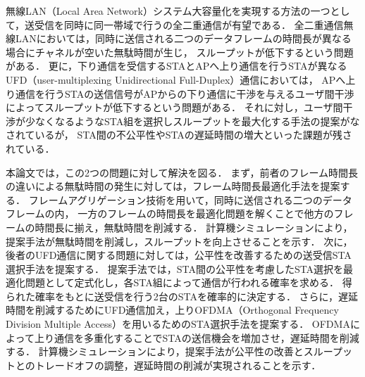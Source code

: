 \documentclass[master]{kuisthesis}		%
\date{平成28年2月8日}				%
\begin{document}
\maketitle					%

\begin{jabstract}				%
	無線LAN（Local Area Network）システム大容量化を実現する方法の一つとして，送受信を同時に同一帯域で行うの全二重通信が有望である．
	全二重通信無線LANにおいては，同時に送信される二つのデータフレームの時間長が異なる場合にチャネルが空いた無駄時間が生じ，
	スループットが低下するという問題がある．
	更に，下り通信を受信するSTAとAPへ上り通信を行うSTAが異なるUFD（user-multiplexing Unidirectional Full-Duplex）通信においては，
	APへ上り通信を行うSTAの送信信号がAPからの下り通信に干渉を与えるユーザ間干渉によってスループットが低下するという問題がある．
	それに対し，ユーザ間干渉が少なくなるようなSTA組を選択しスループットを最大化する手法の提案がなされているが，
	STA間の不公平性やSTAの遅延時間の増大といった課題が残されている．
	\par
	本論文では，この2つの問題に対して解決を図る．
	まず，前者のフレーム時間長の違いによる無駄時間の発生に対しては，フレーム時間長最適化手法を提案する．
	フレームアグリゲーション技術を用いて，同時に送信される二つのデータフレームの内，
	一方のフレームの時間長を最適化問題を解くことで他方のフレームの時間長に揃え，無駄時間を削減する．
	計算機シミュレーションにより，提案手法が無駄時間を削減し，スループットを向上させることを示す．
	次に，後者のUFD通信に関する問題に対しては，公平性を改善するための送受信STA選択手法を提案する．
	提案手法では，STA間の公平性を考慮したSTA選択を最適化問題として定式化し，各STA組によって通信が行われる確率を求める．
	得られた確率をもとに送受信を行う2台のSTAを確率的に決定する．
	さらに，遅延時間を削減するためにUFD通信加え，上りOFDMA（Orthogonal Frequency Division Multiple Access）を用いるためのSTA選択手法を提案する．
	OFDMAによって上り通信を多重化することでSTAの送信機会を増加させ，遅延時間を削減する．
	計算機シミュレーションにより，提案手法が公平性の改善とスループットとのトレードオフの調整，遅延時間の削減が実現されることを示す．
\end{jabstract}
\end{document}
